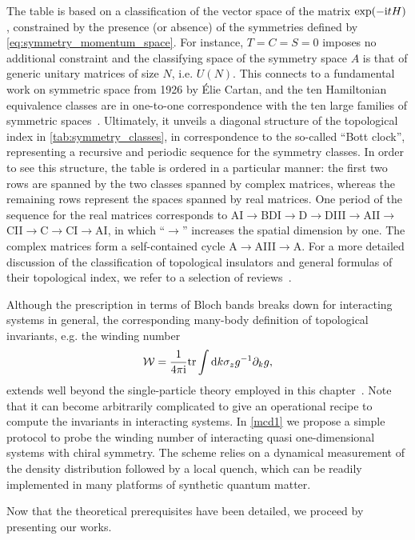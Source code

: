 The table is based on a classification of the vector space of the matrix $\exp(-\mathrm i t H)$, constrained by the presence (or absence) of the symmetries defined by \cref{eq:symmetry_momentum_space}.
For instance, $T=C=S=0$ imposes no additional constraint and the classifying space of the symmetry space $A$ is that of generic unitary matrices of size $N$, i.e. $U(N)$.
This connects to a fundamental work on symmetric space from 1926 by Élie Cartan, and the ten Hamiltonian equivalence classes are in one-to-one correspondence with the ten large families of symmetric spaces~\cite{Heinzner2005}.
Ultimately, it unveils a diagonal structure of the topological index in \cref{tab:symmetry_classes}, in correspondence to the so-called ``Bott clock'', representing a recursive and periodic sequence for the symmetry classes.
In order to see this structure, the table is ordered in a particular manner: the first two rows are spanned by the two classes spanned by complex matrices, whereas the remaining rows represent the spaces spanned by real matrices.
One period of the sequence for the real matrices corresponds to AI$\rightarrow$BDI$\rightarrow$D$\rightarrow$DIII$\rightarrow$AII$\rightarrow$CII$\rightarrow$C$\rightarrow$CI$\rightarrow$AI, in which ``$\rightarrow$'' increases the spatial dimension by one.
The complex matrices form a self-contained cycle A$\rightarrow$AIII$\rightarrow$A.
For a more detailed discussion of the classification of topological insulators and general formulas of their topological index, we refer to a selection of reviews~\cite{Hasan2010,Chiu2016,Cooper2019}.

Although the prescription in terms of Bloch bands breaks down for interacting systems in general, the corresponding many-body definition of topological invariants, e.g. the winding number
\begin{align}
    \mathcal W = \frac{1}{4\pi\mathrm i} {\rm tr}\int\mathrm d k \sigma_z g^{-1}\partial_k g,
    \label{eq:winding_number_greens}
\end{align}
extends well beyond the single-particle theory employed in this chapter~\cite{Gurarie2011,Manmana2012}.
Note that it can become arbitrarily complicated to give an operational recipe to compute the invariants in interacting systems.
In \cref{mcd1} we propose a simple protocol to probe the winding number of interacting quasi one-dimensional systems with chiral symmetry.
The scheme relies on a dynamical measurement of the density distribution followed by a local quench, which can be readily implemented in many platforms of synthetic quantum matter.

Now that the theoretical prerequisites have been detailed, we proceed by presenting our works.
